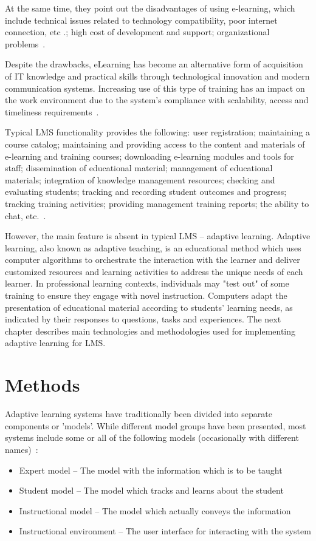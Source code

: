 \documentclass[a4paper,14pt,oneside,final]{extarticle}
\begin{document}
At the same time, they point out the disadvantages of using e-learning, which include technical issues related to technology compatibility, poor internet connection, etc .; high cost of development and support; organizational problems~\cite{Implementing}.

Despite the drawbacks, eLearning has become an alternative form of acquisition of IT knowledge and practical skills through technological innovation and modern communication systems. Increasing use of this type of training has an impact on the work environment due to the system's compliance with scalability, access and timeliness requirements~\cite{Corporate}.

Typical LMS functionality provides the following: user registration; maintaining a course catalog; maintaining and providing access to the content and materials of e-learning and training courses; downloading e-learning modules and tools for staff; dissemination of educational material; management of educational materials; integration of knowledge management resources; checking and evaluating students; tracking and recording student outcomes and progress; tracking training activities; providing management training reports; the ability to chat, etc.~\cite{elearning,Encyclopedia,CMS}.

However, the main feature is absent in typical LMS – adaptive learning. Adaptive learning, also known as adaptive teaching, is an educational method which uses computer algorithms to orchestrate the interaction with the learner and deliver customized resources and learning activities to address the unique needs of each learner. In professional learning contexts, individuals may "test out" of some training to ensure they engage with novel instruction. Computers adapt the presentation of educational material according to students' learning needs, as indicated by their responses to questions, tasks and experiences. The next chapter describes main technologies and methodologies used for implementing adaptive learning for LMS. 

\section{Methods}
Adaptive learning systems have traditionally been divided into separate components or 'models'. While different model groups have been presented, most systems include some or all of the following models (occasionally with different names)~\cite{Facilitating,Noura}:
\begin{itemize}
    \item Expert model – The model with the information which is to be taught
    \item Student model – The model which tracks and learns about the student
    \item Instructional model – The model which actually conveys the information
    \item Instructional environment – The user interface for interacting with the system
\end{itemize}
\end{document}
